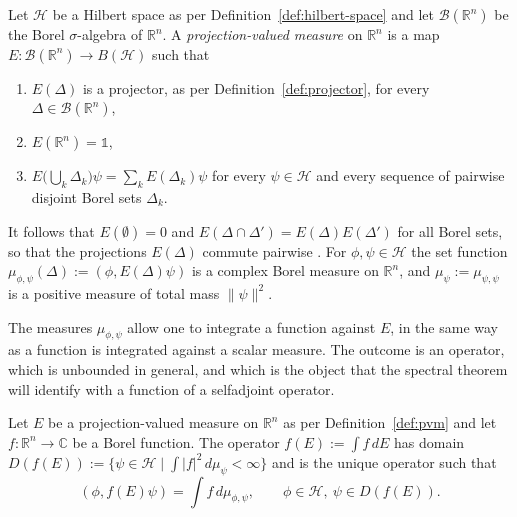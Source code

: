\begin{definition}\label{def:pvm}
	Let $\mathcal{H}$ be a Hilbert space as per Definition~\ref{def:hilbert-space} and let $\mathcal{B}(\mathbb{R}^n)$ be the Borel $\sigma$-algebra of $\mathbb{R}^n$. A \emph{projection-valued measure} on $\mathbb{R}^n$ is a map $E:\mathcal{B}(\mathbb{R}^n)\to B(\mathcal{H})$ such that
	\begin{enumerate}
		\item $E(\Delta)$ is a projector, as per Definition~\ref{def:projector}, for every $\Delta\in\mathcal{B}(\mathbb{R}^n)$,
		\item $E(\mathbb{R}^n)=\mathbb{1}$,
		\item $E\big(\bigcup_{k}\Delta_k\big)\psi=\sum_k E(\Delta_k)\psi$ for every $\psi\in\mathcal{H}$ and every sequence of pairwise disjoint Borel sets $\Delta_k$.
	\end{enumerate}
\end{definition}

\begin{remark}\label{rem:pvm-properties}
	It follows that $E(\emptyset)=0$ and $E(\Delta\cap\Delta')=E(\Delta)E(\Delta')$ for all Borel sets, so that the projections $E(\Delta)$ commute pairwise \cite[TODO-location]{TODO-RS03}. For $\phi,\psi\in\mathcal{H}$ the set function $\mu_{\phi,\psi}(\Delta):=(\phi,E(\Delta)\psi)$ is a complex Borel measure on $\mathbb{R}^n$, and $\mu_\psi:=\mu_{\psi,\psi}$ is a positive measure of total mass $\|\psi\|^2$.
\end{remark}

The measures $\mu_{\phi,\psi}$ allow one to integrate a function against $E$, in the same way as a function is integrated against a scalar measure. The outcome is an operator, which is unbounded in general, and which is the object that the spectral theorem will identify with a function of a selfadjoint operator.

\begin{definition}\label{def:pvm-integral}
	Let $E$ be a projection-valued measure on $\mathbb{R}^n$ as per Definition~\ref{def:pvm} and let $f:\mathbb{R}^n\to\mathbb{C}$ be a Borel function. The operator $f(E):=\int f\,dE$ has domain $D(f(E)):=\big\{\psi\in\mathcal{H}\mid\int|f|^2\,d\mu_\psi<\infty\big\}$ and is the unique operator such that
	\begin{equation*}
		(\phi,f(E)\psi)=\int f\,d\mu_{\phi,\psi}, \qquad \phi\in\mathcal{H},\ \psi\in D(f(E)).
	\end{equation*}
\end{definition}

